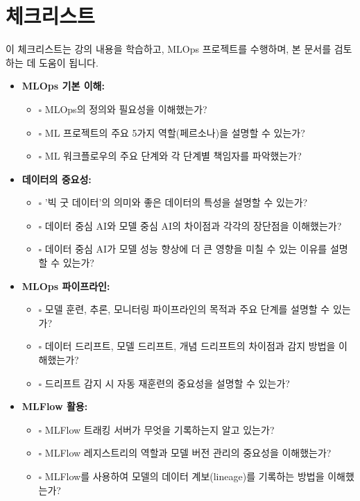 \documentclass[11pt,a4paper]{article}
\theoremstyle{definition}
\begin{document}
\newpage
\section{체크리스트}

이 체크리스트는 강의 내용을 학습하고, MLOps 프로젝트를 수행하며, 본 문서를 검토하는 데 도움이 됩니다.

\begin{itemize}
    \item \textbf{MLOps 기본 이해:}
    \begin{itemize}
        \item $\square$ MLOps의 정의와 필요성을 이해했는가?
        \item $\square$ ML 프로젝트의 주요 5가지 역할(페르소나)을 설명할 수 있는가?
        \item $\square$ ML 워크플로우의 주요 단계와 각 단계별 책임자를 파악했는가?
    \end{itemize}
    \item \textbf{데이터의 중요성:}
    \begin{itemize}
        \item $\square$ '빅 굿 데이터'의 의미와 좋은 데이터의 특성을 설명할 수 있는가?
        \item $\square$ 데이터 중심 AI와 모델 중심 AI의 차이점과 각각의 장단점을 이해했는가?
        \item $\square$ 데이터 중심 AI가 모델 성능 향상에 더 큰 영향을 미칠 수 있는 이유를 설명할 수 있는가?
    \end{itemize}
    \item \textbf{MLOps 파이프라인:}
    \begin{itemize}
        \item $\square$ 모델 훈련, 추론, 모니터링 파이프라인의 목적과 주요 단계를 설명할 수 있는가?
        \item $\square$ 데이터 드리프트, 모델 드리프트, 개념 드리프트의 차이점과 감지 방법을 이해했는가?
        \item $\square$ 드리프트 감지 시 자동 재훈련의 중요성을 설명할 수 있는가?
    \end{itemize}
    \item \textbf{MLFlow 활용:}
    \begin{itemize}
        \item $\square$ MLFlow 트래킹 서버가 무엇을 기록하는지 알고 있는가?
        \item $\square$ MLFlow 레지스트리의 역할과 모델 버전 관리의 중요성을 이해했는가?
        \item $\square$ MLFlow를 사용하여 모델의 데이터 계보(lineage)를 기록하는 방법을 이해했는가?

\end{itemize}
\end{itemize}
\end{document}
